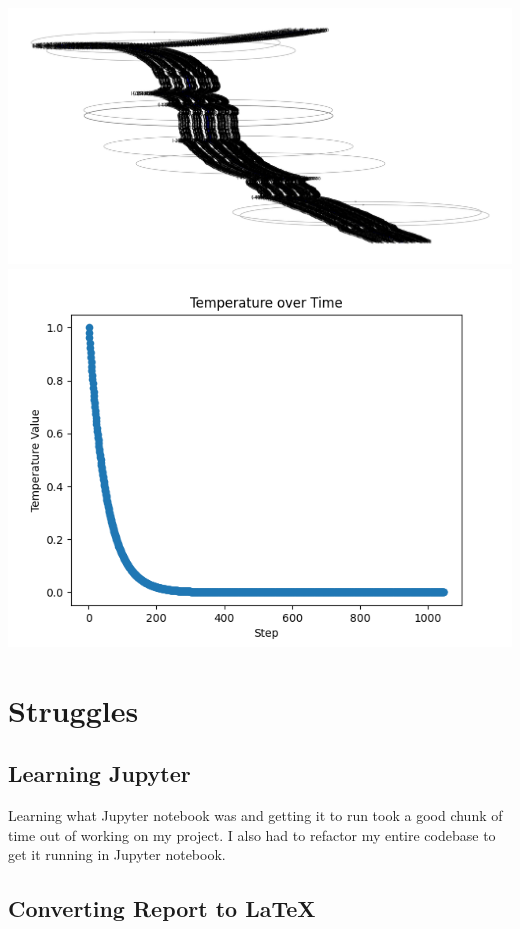 \documentclass{article}
\begin{document}
\includegraphics[width=6in]{_static/Figure_5_Temp=1.02_Path=1031.png}
\includegraphics[width=6in]{_static/Figure_8_Temp=1.02_Temp-over-Time.png}

\section{Struggles}

\subsection{Learning Jupyter}

Learning what Jupyter notebook was and getting it to run took a good chunk of 
time out of working on my project. I also had to refactor my entire codebase 
to get it running in Jupyter notebook.

\subsection{Converting Report to LaTeX}
\end{document}

